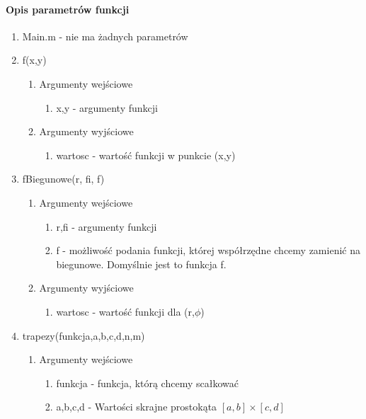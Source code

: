 \documentclass{article}
\begin{document}
\paragraph{Opis parametrów funkcji}
\begin{enumerate}
    \item Main.m - nie ma żadnych parametrów
    \item f(x,y)
        \begin{enumerate}
            \item Argumenty wejściowe
            \begin{enumerate}
                \item x,y - argumenty funkcji
            \end{enumerate}
            \item Argumenty wyjściowe
            \begin{enumerate}
                  \item wartosc - wartość funkcji w punkcie (x,y)
            \end{enumerate}
        \end{enumerate}
    \item fBiegunowe(r, fi, f)
        \begin{enumerate}
            \item Argumenty wejściowe
            \begin{enumerate}
                \item r,fi - argumenty funkcji
                \item f - możliwość podania funkcji, której współrzędne chcemy zamienić na biegunowe. Domyślnie jest to funkcja f.
            \end{enumerate}
            \item Argumenty wyjściowe
            \begin{enumerate}
                  \item wartosc - wartość funkcji dla (r,$\phi$)
            \end{enumerate}
        \end{enumerate}
    \item trapezy(funkcja,a,b,c,d,n,m)
    \begin{enumerate}
            \item Argumenty wejściowe
            \begin{enumerate}
                \item funkcja - funkcja, którą chcemy scałkować
                \item a,b,c,d - Wartości skrajne prostokąta $[a,b]\times[c,d]$

\end{enumerate}
\end{enumerate}
\end{enumerate}
\end{document}
